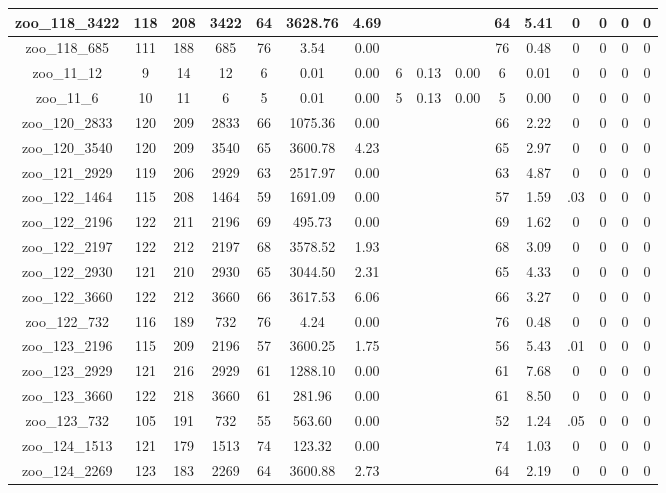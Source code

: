 \begin{landscape}
\begin{longtable}{|c|c|c|c|c|c|c|c|c|c|c|c|c|c|c|c|}
zoo\_118\_3422 & 118 & 208 & 3422 & 64 & 3628.76 & 4.69 &  &  &  & 64 & 5.41 & 0 & 0 & 0 & 0 \\ \hline 
zoo\_118\_685 & 111 & 188 & 685 & 76 & 3.54 & 0.00 &  &  &  & 76 & 0.48 & 0 & 0 & 0 & 0 \\ \hline 
zoo\_11\_12 & 9 & 14 & 12 & 6 & 0.01 & 0.00 & 6 & 0.13 & 0.00 & 6 & 0.01 & 0 & 0 & 0 & 0 \\ \hline 
zoo\_11\_6 & 10 & 11 & 6 & 5 & 0.01 & 0.00 & 5 & 0.13 & 0.00 & 5 & 0.00 & 0 & 0 & 0 & 0 \\ \hline 
zoo\_120\_2833 & 120 & 209 & 2833 & 66 & 1075.36 & 0.00 &  &  &  & 66 & 2.22 & 0 & 0 & 0 & 0 \\ \hline 
zoo\_120\_3540 & 120 & 209 & 3540 & 65 & 3600.78 & 4.23 &  &  &  & 65 & 2.97 & 0 & 0 & 0 & 0 \\ \hline 
zoo\_121\_2929 & 119 & 206 & 2929 & 63 & 2517.97 & 0.00 &  &  &  & 63 & 4.87 & 0 & 0 & 0 & 0 \\ \hline 
zoo\_122\_1464 & 115 & 208 & 1464 & 59 & 1691.09 & 0.00 &  &  &  & 57 & 1.59 & .03 & 0 & 0 & 0 \\ \hline 
zoo\_122\_2196 & 122 & 211 & 2196 & 69 & 495.73 & 0.00 &  &  &  & 69 & 1.62 & 0 & 0 & 0 & 0 \\ \hline 
zoo\_122\_2197 & 122 & 212 & 2197 & 68 & 3578.52 & 1.93 &  &  &  & 68 & 3.09 & 0 & 0 & 0 & 0 \\ \hline 
zoo\_122\_2930 & 121 & 210 & 2930 & 65 & 3044.50 & 2.31 &  &  &  & 65 & 4.33 & 0 & 0 & 0 & 0 \\ \hline 
zoo\_122\_3660 & 122 & 212 & 3660 & 66 & 3617.53 & 6.06 &  &  &  & 66 & 3.27 & 0 & 0 & 0 & 0 \\ \hline 
zoo\_122\_732 & 116 & 189 & 732 & 76 & 4.24 & 0.00 &  &  &  & 76 & 0.48 & 0 & 0 & 0 & 0 \\ \hline 
zoo\_123\_2196 & 115 & 209 & 2196 & 57 & 3600.25 & 1.75 &  &  &  & 56 & 5.43 & .01 & 0 & 0 & 0 \\ \hline 
zoo\_123\_2929 & 121 & 216 & 2929 & 61 & 1288.10 & 0.00 &  &  &  & 61 & 7.68 & 0 & 0 & 0 & 0 \\ \hline 
zoo\_123\_3660 & 122 & 218 & 3660 & 61 & 281.96 & 0.00 &  &  &  & 61 & 8.50 & 0 & 0 & 0 & 0 \\ \hline 
zoo\_123\_732 & 105 & 191 & 732 & 55 & 563.60 & 0.00 &  &  &  & 52 & 1.24 & .05 & 0 & 0 & 0 \\ \hline 
zoo\_124\_1513 & 121 & 179 & 1513 & 74 & 123.32 & 0.00 &  &  &  & 74 & 1.03 & 0 & 0 & 0 & 0 \\ \hline 
zoo\_124\_2269 & 123 & 183 & 2269 & 64 & 3600.88 & 2.73 &  &  &  & 64 & 2.19 & 0 & 0 & 0 & 0 \\ \hline 

\end{longtable}
\end{landscape}
